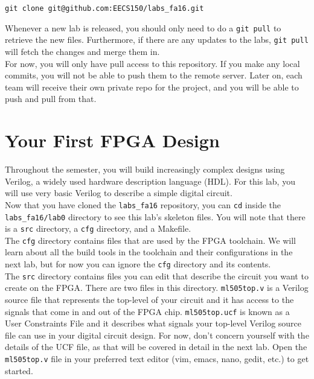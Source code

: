 \documentclass[11pt]{article}
\begin{document}
\begin{verbatim}
git clone git@github.com:EECS150/labs_fa16.git
\end{verbatim}

Whenever a new lab is released, you should only need to do a \verb|git pull| to retrieve the new files. Furthermore, if there are any updates to the labs, \verb|git pull| will fetch the changes and merge them in.\\

For now, you will only have pull access to this repository. If you make any local commits, you will not be able to push them to the remote server. Later on, each team will receive their own private repo for the project, and you will be able to push and pull from that.

\section{Your First FPGA Design}
Throughout the semester, you will build increasingly complex designs using Verilog, a widely used hardware description language (HDL). For this lab, you will use very basic Verilog to describe a simple digital circuit.\\

Now that you have cloned the \verb|labs_fa16| repository, you can \verb|cd| inside the 
\verb|labs_fa16/lab0| directory to see this lab's skeleton files. You will note that there is a \verb|src| directory, a \verb|cfg| directory, and a Makefile. \\

The \verb|cfg| directory contains files that are used by the FPGA toolchain. We will learn about all the build tools in the toolchain and their configurations in the next lab, but for now you can ignore the \verb|cfg| directory and its contents. \\

The \verb|src| directory contains files you can edit that describe the circuit you want to create on the FPGA. There are two files in this directory. \verb|ml505top.v| is a Verilog source file that represents the top-level of your circuit and it has access to the signals that come in and out of the FPGA chip. \verb|ml505top.ucf| is known as a User Constraints File and it describes what signals your top-level Verilog source file can use in your digital circuit design. For now, don't concern yourself with the details of the UCF file, as that will be covered in detail in the next lab. Open the \verb|ml505top.v| file in your preferred text editor (vim, emacs, nano, gedit, etc.) to get started. \\
\end{document}

